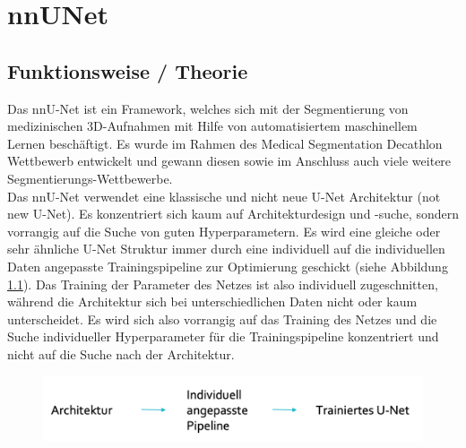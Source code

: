 \chapter{nnUNet}
\label{ch:nnunet}


\section{Funktionsweise / Theorie}



Das nnU-Net ist ein Framework, welches sich mit der Segmentierung von medizinischen 3D-Aufnahmen mit Hilfe von automatisiertem maschinellem Lernen beschäftigt. Es wurde im Rahmen des Medical Segmentation Decathlon Wettbewerb entwickelt und gewann diesen sowie im Anschluss auch viele weitere Segmentierungs-Wettbewerbe. \\
Das nnU-Net verwendet eine klassische und nicht neue U-Net Architektur (not new U-Net). Es konzentriert sich kaum auf  Architekturdesign und -suche, sondern vorrangig auf die Suche von guten Hyperparametern. Es wird eine gleiche oder sehr ähnliche U-Net Struktur immer durch eine individuell auf die individuellen Daten angepasste Trainingspipeline zur Optimierung geschickt (siehe Abbildung \ref{pic:nnUnet_Basisschema}). Das Training der Parameter des Netzes ist also individuell zugeschnitten, während die Architektur sich bei unterschiedlichen Daten nicht oder kaum unterscheidet. Es wird sich also vorrangig auf das Training des Netzes und die Suche individueller Hyperparameter für die Trainingspipeline konzentriert und nicht auf die Suche nach der Architektur. 

\begin{figure}[H]
	
	\centering
	\includegraphics[scale=0.3]{Pictures/nnUnet/Bild01.png}
	\caption{}
	\label{pic:nnUnet_Basisschema}
\end{figure}



